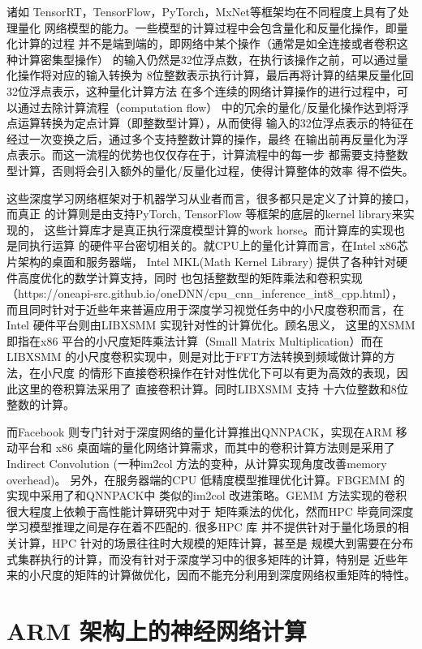 诸如 TensorRT，TensorFlow，PyTorch，MxNet等框架均在不同程度上具有了处理量化
网络模型的能力。一些模型的计算过程中会包含量化和反量化操作，即量化计算的过程
并不是端到端的，即网络中某个操作（通常是如全连接或者卷积这种计算密集型操作）
的输入仍然是32位浮点数，在执行该操作之前，可以通过量化操作将对应的输入转换为
8位整数表示执行计算，最后再将计算的结果反量化回32位浮点表示，这种量化计算方法
在多个连续的网络计算操作的进行过程中，可以通过去除计算流程（computation flow）
中的冗余的量化/反量化操作达到将浮点运算转换为定点计算（即整数型计算），从而使得
输入的32位浮点表示的特征在经过一次变换之后，通过多个支持整数计算的操作，最终
在输出前再反量化为浮点表示。而这一流程的优势也仅仅存在于，计算流程中的每一步
都需要支持整数型计算，否则将会引入额外的量化/反量化过程，使得计算整体的效率
得不偿失。

这些深度学习网络框架对于机器学习从业者而言，很多都只是定义了计算的接口，而真正
的计算则是由支持PyTorch, TensorFlow 等框架的底层的kernel library来实现的，
这些计算库才是真正执行深度模型计算的work horse。而计算库的实现也是同执行运算
的硬件平台密切相关的。就CPU上的量化计算而言，在Intel x86芯片架构的桌面和服务器端，
Intel MKL(Math Kernel Library) 提供了各种针对硬件高度优化的数学计算支持，同时
也包括整数型的矩阵乘法和卷积实现（https://oneapi-src.github.io/oneDNN/cpu_cnn_inference_int8_cpp.html），
而且同时针对于近些年来普遍应用于深度学习视觉任务中的小尺度卷积而言，在Intel
硬件平台则由LIBXSMM\cite{Heinecke2016LIBXSMMAS} 实现针对性的计算优化。顾名思义，
这里的XSMM 即指在x86 平台的小尺度矩阵乘法计算（Small Matrix Multiplication）而在
LIBXSMM 的小尺度卷积实现中，则是对比于FFT方法转换到频域做计算的方法，在小尺度
的情形下直接卷积操作在针对性优化下可以有更为高效的表现，因此这里的卷积算法采用了
直接卷积计算。同时LIBXSMM 支持 十六位整数和8位整数的计算。

而Facebook 则专门针对于深度网络的量化计算推出QNNPACK，实现在ARM 移动平台和
x86 桌面端的量化网络计算需求，而其中的卷积计算方法则是采用了 Indirect Convolution
\cite{Dukhan2019TheIC}(一种im2col 方法的变种，从计算实现角度改善memory overhead)。
另外，在服务器端的CPU 低精度模型推理优化计算。FBGEMM 的实现中采用了和QNNPACK中
类似的im2col 改进策略。GEMM 方法实现的卷积很大程度上依赖于高性能计算研究中对于
矩阵乘法的优化，然而HPC 毕竟同深度学习模型推理之间是存在着不匹配的. 很多HPC 库
并不提供针对于量化场景的相关计算，HPC 针对的场景往往时大规模的矩阵计算，甚至是
规模大到需要在分布式集群执行的计算，而没有针对于深度学习中的很多矩阵的计算，特别是
近些年来的小尺度的矩阵的计算做优化，因而不能充分利用到深度网络权重矩阵的特性。

\section{ARM 架构上的神经网络计算}
